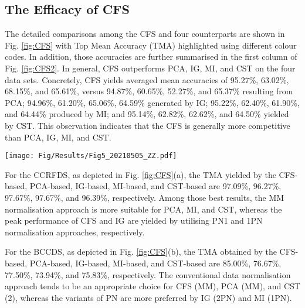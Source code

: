 \documentclass{article}
\newcommand*{\1}{\textcolor{magenta}}
\begin{document}
	\subsection{The Efficacy of CFS}
The detailed comparisons among the CFS and four counterparts are shown in Fig. \ref{fig:CFS} with Top Mean Accuracy (TMA) highlighted using different colour codes. In addition, those accuracies are further summarised in the first column of Fig. \ref{fig:CFS2}. In general, CFS outperforms PCA, IG, MI, and CST on the four data sets. Concretely, CFS yields averaged mean accuracies of 95.27\%, 63.02\%, 68.15\%, and 65.61\%, versus 94.87\%, 60.65\%, 52.27\%, and 65.37\% resulting from PCA; 94.96\%, 61.20\%, 65.06\%, 64.59\% generated by IG; 95.22\%, 62.40\%, 61.90\%, and 64.44\% produced by MI; and 95.14\%, 62.82\%, 62.62\%, and 64.50\% yielded by CST. This observation indicates that the CFS is generally more competitive than PCA, IG, MI, and CST.
	
	\begin{figure*}[!ht]
		\centering
		\texttt{[image: Fig/Results/Fig5\_20210505\_ZZ.pdf]}
		\caption{Detailed classification accuracies of PCA, IG, MI, CST, and CFS feature selection methods on four EHR data sets by varying both feature normalisation methods and classifiers. Best viewed in colour.}
		\label{fig:CFS}
	\end{figure*}
	




	For the CCRFDS, as depicted in Fig. \ref{fig:CFS}(a), the TMA yielded by the CFS-based, PCA-based, IG-based, MI-based, and CST-based are 97.09\%, 96.27\%, 97.67\%, 97.67\%, and 96.39\%, respectively. Among those best results, the MM normalisation approach is more suitable for PCA, MI, and CST, whereas the peak performance of CFS and IG are yielded by utilising PN1 and 1PN normalisation approaches, respectively.
	




	For the BCCDS, as depicted in Fig. \ref{fig:CFS}(b), the TMA obtained by the CFS-based, PCA-based, IG-based, MI-based, and CST-based are 85.00\%, 76.67\%, 77.50\%, 73.94\%, and 75.83\%, respectively. The conventional data normalisation approach tends to be an appropriate choice for CFS (MM), PCA (MM), and CST (2), whereas the variants of PN are more preferred by IG (2PN) and MI (1PN).
	
	
\end{document}
